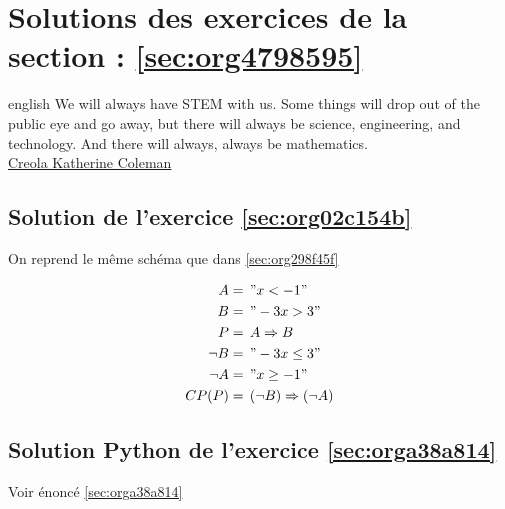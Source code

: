 \documentclass[a4paper, 11pt, twoside]{book}
\begin{document}
\chapter{Solutions des exercices de la section : \ref{sec:org4798595}}
\label{sec:org4bb3cd3}
\startcontents[level-2]

\begin{foreigndisplayquote}{english}
We will always have STEM with us. Some things will drop out of the
public eye and go away, but there will always be science,
engineering, and technology. And there will always, always be
mathematics.\\

\href{https://en.wikipedia.org/wiki/Katherine\_Johnson}{Creola Katherine Coleman}
\end{foreigndisplayquote}

\section{Solution de l'exercice \ref{sec:org02c154b}}
\label{sec:org9049a7b}
On reprend le même schéma que dans \ref{sec:org298f45f}

\begin{align*}
A &=\,"x < -1"\\
B &=\,"-3x > 3"\\
P &=\,A\Rightarrow B\\
\neg B &=\, "-3x \leq 3"\\
\neg A &=\, "x \geq -1"\\
CP(P) &=\,(\neg B)\Rightarrow(\neg A)
\end{align*}

\section{Solution Python de l'exercice \ref{sec:orga38a814}}
\label{sec:org49e8be4}
Voir énoncé \ref{sec:orga38a814}
\end{document}
